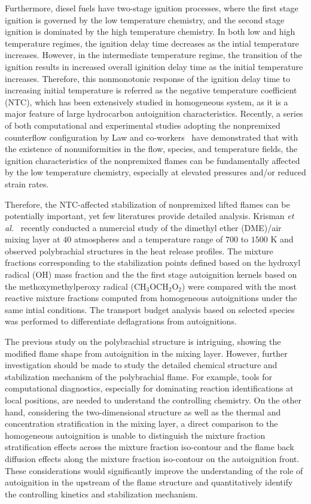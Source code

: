 \documentclass[review,3p,times]{elsarticleUS}
\begin{document}
Furthermore, diesel fuels have two-stage ignition processes, where the first stage ignition is governed by the low temperature chemistry, and the second stage ignition is dominated by the high temperature chemistry.  In both low and high temperature regimes, the ignition delay time decreases as the intial temperature increases.  However, in the intermediate temperature regime, the transition of the ignition results in increased overall iginition delay time as the initial temperature increases.  Therefore, this nonmonotonic response of the ignition delay time to increasing initial temperature is referred as the negative temperature coefficient (NTC), which has been extensively studied in homogeneous system, as it is a major feature of large hydrocarbon autoignition characteristics.  Recently, a series of both computational and experimental studies adopting the nonpremixed counterflow configuration by Law and co-workers~\cite{law12,zhao13,deng14} have demonstrated that with the existence of nonuniformities in the flow, species, and temperature fields, the ignition characteristics of the nonpremixed flames can be fundamentally affected by the low temperature chemistry, especially at elevated pressures and/or reduced strain rates.   

Therefore, the NTC-affected stabilization of nonpremixed lifted flames can be potentially important, yet few literatures provide detailed analysis.  Krisman \emph{et al.}~\cite{krisman14} recently conducted a numercial study of the dimethyl ether (DME)/air mixing layer at $40$ atmospheres and a temperature range of $700$ to $1500$ K and observed polybrachial structures in the heat release profiles.  The mixture fractions corresponding to the stabilization points defined based on the hydroxyl radical (OH) mass fraction and the the first stage autoignition kernels based on the methoxymethylperoxy radical (CH$_3$OCH$_2$O$_2$) were compared with the most reactive mixture fractions computed from homogeneous autoignitions under the same intial conditions.  The transport budget analysis based on selected species was performed to differentiate deflagrations from autoignitions.

The previous study on the polybrachial structure is intriguing, showing the modified flame shape from autoignition in the mixing layer.  However, further investigation should be made to study the detailed chemical structure and stabilization mechanism of the polybrachial flame.  For example, tools for computational diagnostics, especially for dominating reaction identifications at local positions, are needed to understand the controlling chemistry.  On the other hand, considering the two-dimensional structure as well as the thermal and concentration stratification in the mixing layer, a direct comparison to the homogeneous autoignition is unable to distinguish the mixture fraction stratification effects across the mixture fraction iso-contour and the flame back diffusion effects along the mixture fraction iso-contour on the autoignition front.  These considerations would significantly improve the understanding of the role of autoignition in the upstream of the flame structure and quantitatively identify the controlling kinetics and stabilization mechanism.     
\end{document}
